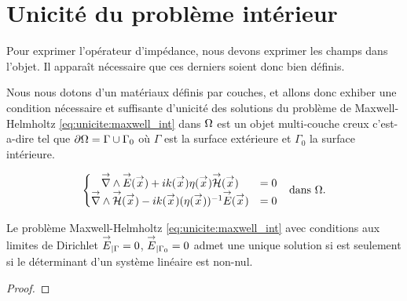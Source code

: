 \section{Unicité du problème intérieur}

Pour exprimer l'opérateur d'impédance, nous devons exprimer les champs dans l'objet. Il apparaît nécessaire que ces derniers soient donc bien définis.

Nous nous dotons d'un matériaux définis par couches, et allons donc exhiber une condition nécessaire et suffisante d'unicité des solutions du problème de Maxwell-Helmholtz  \eqref{eq:unicite:maxwell_int} dans \(\Omega\) est un objet multi-couche creux c'est-a-dire tel que \(\partial \Omega = \Gamma \cup \Gamma_0\) où \(\Gamma\) est la surface extérieure et \(\Gamma_0\) la surface intérieure.

\begin{align}
\left\lbrace
  \begin{matrix}
    {\overset{\rightarrow}{\nabla}}\wedge {\overset{\rightarrow}{E}}({\overset{\rightarrow}{x}}) + i k({\overset{\rightarrow}{x}})\eta({\overset{\rightarrow}{x}}) {\overset{\rightarrow}{\mathcal{H}}}({\overset{\rightarrow}{x}}) &= 0
    \\
    {\overset{\rightarrow}{\nabla}}\wedge {\overset{\rightarrow}{\mathcal{H}}}({\overset{\rightarrow}{x}}) - i k({\overset{\rightarrow}{x}})(\eta({\overset{\rightarrow}{x}}))^{-1} {\overset{\rightarrow}{E}}({\overset{\rightarrow}{x}}) &= 0
  \end{matrix}
  \right. && \text{dans \(\Omega\).}
  \label{eq:unicite:maxwell_int}
\end{align}

\begin{prop}
  Le problème Maxwell-Helmholtz \eqref{eq:unicite:maxwell_int} avec conditions aux limites de Dirichlet \({\overset{\rightarrow}{E}}_{|\Gamma} = 0\), \({\overset{\rightarrow}{E}}_{|\Gamma_0} = 0\) admet une unique solution si est seulement si le déterminant d'un système linéaire est non-nul.
\end{prop}
\begin{proof}
\end{proof}